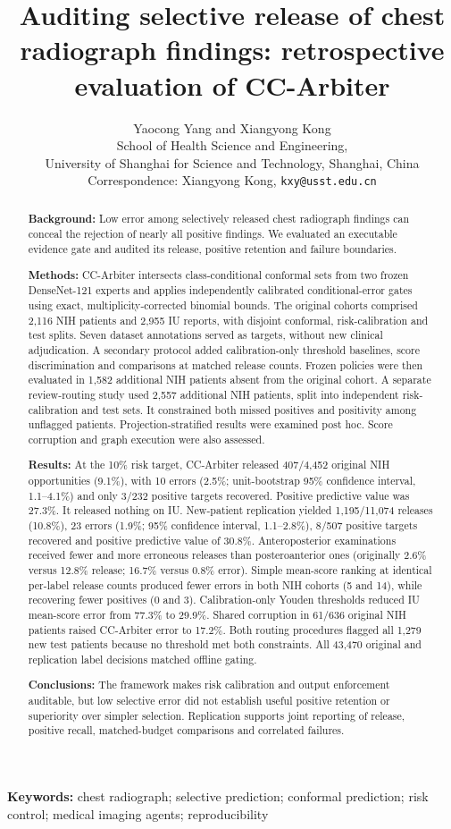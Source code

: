 \documentclass[10pt,a4paper]{article}
\title{Auditing selective release of chest radiograph findings: retrospective evaluation of CC-Arbiter}
\author{Yaocong Yang and Xiangyong Kong\\[4pt]
\small School of Health Science and Engineering,\\
\small University of Shanghai for Science and Technology, Shanghai, China\\
\small Correspondence: Xiangyong Kong, \texttt{kxy@usst.edu.cn}}
\date{}
\begin{document}
\maketitle
\begin{abstract}
\noindent\textbf{Background:} Low error among selectively released chest radiograph findings can conceal the rejection of nearly all positive findings. We evaluated an executable evidence gate and audited its release, positive retention and failure boundaries.\par
\noindent\textbf{Methods:} CC-Arbiter intersects class-conditional conformal sets from two frozen DenseNet-121 experts and applies independently calibrated conditional-error gates using exact, multiplicity-corrected binomial bounds. The original cohorts comprised 2,116 NIH patients and 2,955 IU reports, with disjoint conformal, risk-calibration and test splits. Seven dataset annotations served as targets, without new clinical adjudication. A secondary protocol added calibration-only threshold baselines, score discrimination and comparisons at matched release counts. Frozen policies were then evaluated in 1,582 additional NIH patients absent from the original cohort. A separate review-routing study used 2,557 additional NIH patients, split into independent risk-calibration and test sets. It constrained both missed positives and positivity among unflagged patients. Projection-stratified results were examined post hoc. Score corruption and graph execution were also assessed.\par
\noindent\textbf{Results:} At the 10\% risk target, CC-Arbiter released 407/4,452 original NIH opportunities (9.1\%), with 10 errors (2.5\%; unit-bootstrap 95\% confidence interval, 1.1--4.1\%) and only 3/232 positive targets recovered. Positive predictive value was 27.3\%. It released nothing on IU. New-patient replication yielded 1,195/11,074 releases (10.8\%), 23 errors (1.9\%; 95\% confidence interval, 1.1--2.8\%), 8/507 positive targets recovered and positive predictive value of 30.8\%. Anteroposterior examinations received fewer and more erroneous releases than posteroanterior ones (originally 2.6\% versus 12.8\% release; 16.7\% versus 0.8\% error). Simple mean-score ranking at identical per-label release counts produced fewer errors in both NIH cohorts (5 and 14), while recovering fewer positives (0 and 3). Calibration-only Youden thresholds reduced IU mean-score error from 77.3\% to 29.9\%. Shared corruption in 61/636 original NIH patients raised CC-Arbiter error to 17.2\%. Both routing procedures flagged all 1,279 new test patients because no threshold met both constraints. All 43,470 original and replication label decisions matched offline gating.\par
\noindent\textbf{Conclusions:} The framework makes risk calibration and output enforcement auditable, but low selective error did not establish useful positive retention or superiority over simpler selection. Replication supports joint reporting of release, positive recall, matched-budget comparisons and correlated failures.
\end{abstract}
\noindent\textbf{Keywords:} chest radiograph; selective prediction; conformal prediction; risk control; medical imaging agents; reproducibility
\end{document}
